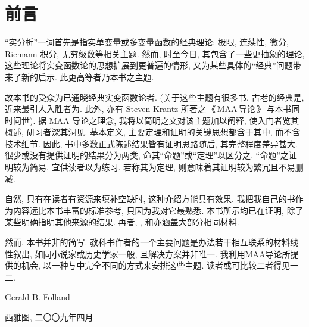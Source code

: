 \chapter{前言}
``实分析''一词首先是指实单变量或多变量函数的经典理论: 极限, 连续性, 微分, Riemann 积分, 无穷级数等相关主题. 然而, 时至今日, 其包含了一些更抽象的理论, 这些理论将实变函数论的思想扩展到更普遍的情形, 又为某些具体的``经典''问题带来了新的启示. 此更高等者乃本书之主题.

故本书的受众为已通晓经典实变函数论者. (关于这些主题有很多书, 古老的经典是\cite{rudin1976principles}, 近来最引人入胜者为\cite{korner2004companion}. 此外, 亦有 Steven Krantz 所著之\,《\,MAA\,导论\,》\,\cite{krantz2014guide}与本书同时问世). 据 MAA 导论之理念, 我将以简明之文对该主题加以阐释, 使入门者览其概述, 研习者深其洞见. 基本定义, 主要定理和证明的关键思想都含于其中, 而不含技术细节. 因此, 书中多数正式陈述结果皆有证明思路随后, 其完整程度差异甚大. 很少或没有提供证明的结果分为两类, 命其``命题''或``定理''以区分之. ``命题''之证明较为简易, 宜供读者以为练习. 若称其为定理, 则意味着其证明较为繁冗且不易删减.

自然, 只有在读者有资源来填补空缺时, 这种介绍方能具有效果. 我把我自己的书\cite{folland1999real}作为内容远比本书丰富的标准参考, 只因为我对它最熟悉. 本书所示均已在\cite{folland1999real}证明, 除了某些明确指明其他来源的结果. 再者, \cite{lang2012real}, \cite{royden1988real}和\cite{rudin1987realcomplex}亦涵盖大部分相同材料.

然而, 本书并非\cite{folland1999real}的简写. 教科书作者的一个主要问题是办法若干相互联系的材料线性叙出, 如同小说家或历史学家一般, 且解决方案并非唯一. 我利用MAA导论所提供的机会, 以一种与\cite{folland1999real}中完全不同的方式来安排这些主题. 读者或可比较二者得见一二.

\begin{flushright}
    {Gerald B. Folland}\par\kaishu 西雅图, 二〇〇九年四月
\end{flushright}